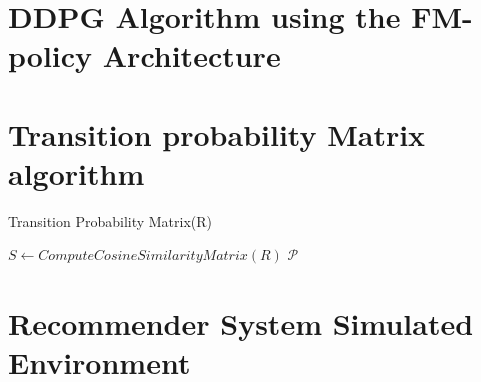 
\appendix
\chapter{DDPG Algorithm using the FM-policy Architecture}
\label{app:ddpgfm}

\chapter{Transition probability Matrix algorithm}
\label{app:trans_prob_alg}

\begin{center}
 \begin{algorithm}[!htbp]
    \DontPrintSemicolon
    \caption{Transition Probability Matrix(R)}
    \label{alg:transition_matrix}
    
    $S \leftarrow ComputeCosineSimilarityMatrix(R)$\;
    \KwRet $\mathcal{P}$
  \end{algorithm}
\end{center}

\chapter{Recommender System Simulated Environment}
\label{app:simulated_env}

